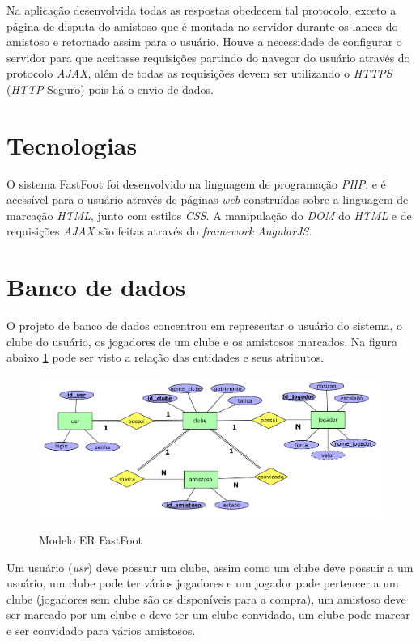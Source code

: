 \documentclass[11pt,a4paper]{article}
\begin{document}
        Na aplicação desenvolvida todas as respostas obedecem tal protocolo, exceto a página de disputa do amistoso que é montada no servidor durante os lances do amistoso e retornado assim para o usuário. Houve a necessidade de configurar o servidor para que aceitasse requisições partindo do navegor do usuário através do protocolo \textit{AJAX}, além de todas as requisições devem ser utilizando o \textit{HTTPS} (\textit{HTTP} Seguro) pois há o envio de dados.
        
	\section*{Tecnologias}
    	O sistema FastFoot foi desenvolvido na linguagem de programação \textit{PHP}, e é acessível para o usuário através de páginas \textit{web} construídas sobre a linguagem de marcação \textit{HTML}, junto com estilos \textit{CSS}. A manipulação do \textit{DOM} do \textit{HTML} e de requisições \textit{AJAX} são feitas através do \textit{framework} \textit{AngularJS}.
        
	\section*{Banco de dados}
    	O projeto de banco de dados concentrou em representar o usuário do sistema, o clube do usuário, os jogadores de um clube e os amistosos marcados. Na figura abaixo \ref{model_er} pode ser visto a relação das entidades e seus atributos.
        
        \begin{figure}[!htb]
        	\centering
        	\includegraphics[scale=0.43]{fastfoot_modeloER.png}
        	\label{model_er}
            \caption{Modelo ER FastFoot}
  		\end{figure}
        
      	Um usuário (\textit{usr}) deve possuir um clube, assim como um clube deve possuir a um usuário, um clube pode ter vários jogadores e um jogador pode pertencer a um clube (jogadores sem clube são os disponíveis para a compra), um amistoso deve ser marcado por um clube e deve ter um clube convidado, um clube pode marcar e ser convidado para vários amistosos.
        
\end{document}
